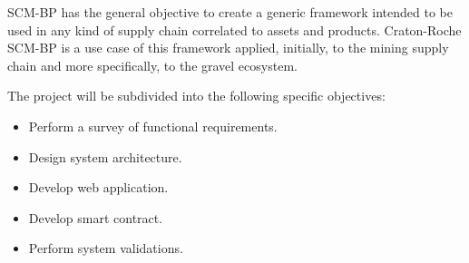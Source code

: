
\acresetall 

\ac{SCM-BP} has the general objective to create a generic framework intended to be used in any kind of supply chain correlated to assets and products. 
Craton-Roche SCM-BP is a use case of this framework applied, initially, to the mining supply chain and more specifically, to the gravel ecosystem.

The project will be subdivided into the following specific objectives:
\begin{itemize}
\item Perform a survey of functional requirements.
\item Design system architecture.
\item Develop web application.
\item Develop smart contract.
\item Perform system validations.
\end{itemize}







